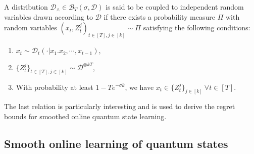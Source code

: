 \begin{definition}[Coupling]
\label{def:coupling}
    A distribution $\mathcal{D}_\wedge \in \mathcal{B}_T (\sigma, \mathcal{D})$ is said to be coupled to independent random variables drawn according to $\mathcal{D}$ if there exists a probability measure $\Pi$ with random variables $(x_t, Z_t^j)_{t \in [T], j \in [k]}\sim\Pi$ satisfying the following conditions:
    \begin{enumerate}
        \item $x_t \sim \mathcal{D}_t (\cdot \vert x_1. x_2, \cdots, x_{t-1})$,
    
        \item $\{ Z_t^j \}_{t \in [T], j \in [k]} \sim \mathcal{D}^{\otimes kT}$,
    
        \item With probability at least $1 - T e^{-\sigma k}$, we have $x_t \in \{ Z_t^j \}_{ j \in [k]} \ \forall t \in [T]$. 
    \end{enumerate}
\end{definition}


The last relation is particularly interesting and is used to derive the regret bounds for smoothed online quantum state learning.


\subsection{Smooth online learning of quantum states}

